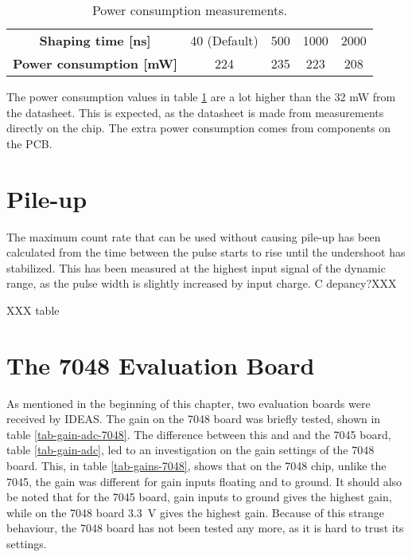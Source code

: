 \documentclass[../main/thesis.tex]{subfiles}
\begin{document}
\begin{table}[h!]
	\begin{center}
		\caption{Power consumption measurements.}
		\label{tab-ide-power}
		\begin{tabular}{ccccc}\toprule
			\textbf{Shaping time [ns]}      & 40 (Default)    & 500    & 1000    & 2000       \\ 
			\textbf{Power consumption [mW]} & 224 & 235 & 223 & 208    \\ \bottomrule
		\end{tabular}
	\end{center}
\end{table}

The power consumption values in table \ref{tab-ide-power} are a lot higher than the 32 mW from the datasheet. This is expected, as the datasheet is made from measurements directly on the chip. The extra power consumption comes from components on the PCB. 

\section{Pile-up}
\label{ide-pileup}

The maximum count rate that can be used without causing pile-up has been calculated from the time between the pulse starts to rise until the undershoot has stabilized. This has been measured at the highest input signal of the dynamic range, as the pulse width is slightly increased by input charge. C depancy?XXX

XXX table


\section{The 7048 Evaluation Board}
\label{ide-7048}

As mentioned in the beginning of this chapter, two evaluation boards were received by IDEAS. The gain on the 7048 board was briefly tested, shown in table \ref{tab-gain-adc-7048}. The difference between this and and the 7045 board, table \ref{tab-gain-adc}, led to an investigation on the gain settings of the 7048 board. This, in table \ref{tab-gains-7048}, shows that on the 7048 chip, unlike the 7045, the gain was different for gain inputs floating and to ground. It should also be noted that for the 7045 board, gain inputs to ground gives the highest gain, while on the 7048 board 3.3~V gives the highest gain. Because of this strange behaviour, the 7048 board has not been tested any more, as it is hard to trust its settings. 
\end{document}
